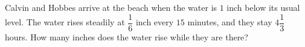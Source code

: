 Calvin and Hobbes arrive at the beach when the water is $1$ inch below its usual level. The water rises steadily at $\dfrac{1}{6}$ inch every $15$ minutes, and they stay $4\dfrac{1}{3}$ hours. How many inches does the water rise while they are there?
